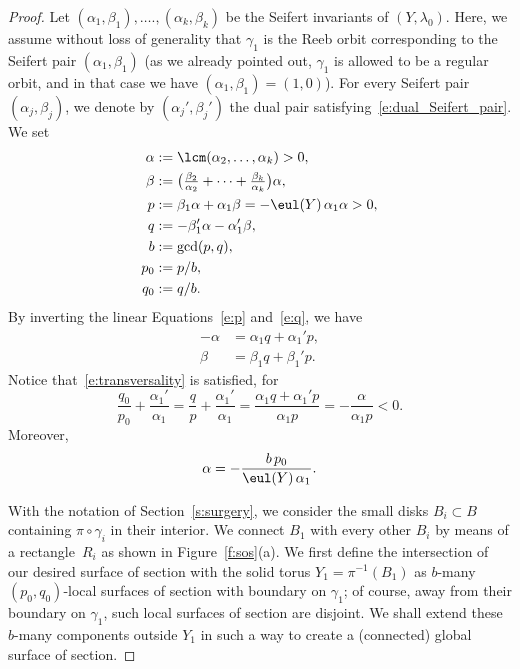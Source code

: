 \begin{proof}
Let $(\alpha_1,\beta_1),\dots.,(\alpha_k,\beta_k)$ be the Seifert invariants of $(Y,\lambda_0)$. Here, we assume without loss of generality that $\gamma_1$ is the Reeb orbit corresponding to the Seifert pair $(\alpha_1,\beta_1)$ (as we already pointed out, $\gamma_1$ is allowed to be a regular orbit, and in that case we have $(\alpha_1,\beta_1)=(1,0)$). For every Seifert pair $(\alpha_j,\beta_j)$, we denote by $(\alpha_j',\beta_j')$ the dual pair satisfying~\eqref{e:dual_Seifert_pair}. We set
\begin{align}
\nonumber
\alpha & :=\lcm(\alpha_2,\dots,\alpha_k)>0,\\
\nonumber
\beta & :=\big(\tfrac{\beta_2}{\alpha_2}+\dots+\tfrac{\beta_k}{\alpha_k}\big)\alpha,\\
\label{e:p}
p & :=\beta_1\alpha + \alpha_1\beta = -\eul(Y)\,\alpha_1\alpha>0,\\
\label{e:q}
q & := -\beta_1'\alpha - \alpha_1'\beta,\\
\nonumber
b & := \gcd(p,q),\\
\nonumber
p_0& :=p/b,\\
\nonumber
q_0& :=q/b.
\end{align}
By inverting the linear Equations~\eqref{e:p} and~\eqref{e:q}, we have
\begin{align*}
- \alpha & = \alpha_1q +\alpha_1' p, \\
\beta & = \beta_1 q + \beta_1' p.
\end{align*}
Notice that~\eqref{e:transversality} is satisfied, for
\[
\frac{q_0}{p_0}+\frac{\alpha_1'}{\alpha_1}
=
\frac{q}{p}+\frac{\alpha_1'}{\alpha_1}
=
\frac{\alpha_1 q + \alpha_1' p}{\alpha_1 p}
=
-\frac{\alpha}{\alpha_1 p}<0.
\]
Moreover,
\[
\alpha=- \frac{b\, p_0}{\eul(Y)\, \alpha_1}.
\]

With the notation of Section~\ref{s:surgery}, we consider the small disks $B_i\subset B$ containing $\pi\circ\gamma_i$ in their interior. We connect $B_1$ with every other $B_i$ by means of a rectangle~$R_i$ as shown in Figure~\ref{f:sos}(a). We first define the intersection of our desired surface of section with the solid torus $Y_1=\pi^{-1}(B_1)$ as $b$-many $(p_0,q_0)$-local surfaces of section with boundary on $\gamma_1$; of course, away from their boundary on $\gamma_1$, such local surfaces of section are disjoint. We shall extend these $b$-many components outside $Y_1$ in such a way to create a (connected) global surface of section.


\end{proof}
